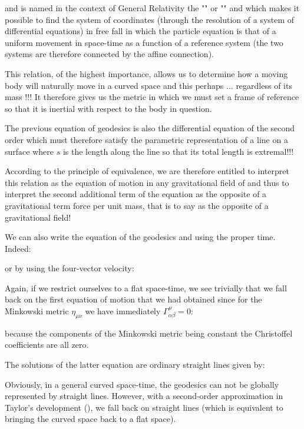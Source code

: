 	and is named in the context of General Relativity the "" or "" and which makes it possible to find the system of coordinates (through the resolution of a system of differential equations) in free fall in which the particle equation is that of a uniform movement in space-time as a function of a reference system (the two systems are therefore connected by the affine connection).

	This relation, of the highest importance, allows us to determine how a moving body will naturally move in a curved space and this perhaps ... regardless of its mass !!! It therefore gives us the metric in which we must set a frame of reference so that it is inertial with respect to the body in question.

	The previous equation of geodesics is also the differential equation of the second order which must therefore satisfy the parametric representation of a line on a surface where $s$ is the length along the line so that its total length is extremal!!!

	According to the principle of equivalence, we are therefore entitled to interpret this relation as the equation of motion in any gravitational field of and thus to interpret the second additional term of the equation as the opposite of a gravitational term force per unit mass, that is to say as the opposite of a gravitational field!
	\begin{tcolorbox}[title=Remark,colframe=black,arc=10pt]
	We can also write the equation of the geodesics and using the proper time. Indeed:
	
	or by using the four-vector velocity:
	
	\end{tcolorbox}
	Again, if we restrict ourselves to a flat space-time, we see trivially that we fall back on the first equation of motion that we had obtained since for the Minkowski metric $\eta_{\mu\nu}$ we have immediately $\Gamma_{\alpha\beta}^\mu=0$:
	
	because the components of the Minkowski metric being constant the Christoffel coefficients are all zero.
	
	The solutions of the latter equation are ordinary straight lines given by:
		
Obviously, in a general curved space-time, the geodesics can not be globally represented by straight lines. However, with a second-order approximation in Taylor's development (), we fall back on straight lines (which is equivalent to bringing the curved space back to a flat space).

